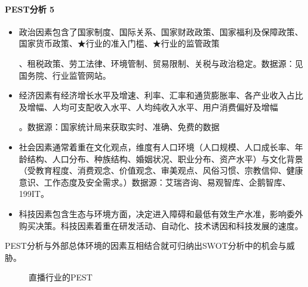 \documentclass[letterpaper,10pt,english]{sphinxmanual}
\begin{document}
\paragraph{PEST分析 5\sphinxfootnotemark[490]}
\label{\detokenize{chapter_knowledge/BRD:pest-5}}%
\begin{footnotetext}[490]\sphinxAtStartFootnote
{}
%
\end{footnotetext}\ignorespaces \begin{itemize}
\item {} 
政治因素包含了国家制度、国际关系、国家财政政策、国家福利及保障政策、国家货币政策、★行业的准入门槛、★行业的监管政策%
\begin{footnote}[491]\sphinxAtStartFootnote
{}
%
\end{footnote}、租税政策、劳工法律、环境管制、贸易限制、关税与政治稳定。数据源：见国务院、行业监管网站。

\item {} 
经济因素有经济增长水平及增速、利率、汇率和通货膨胀率、各产业收入占比及增幅、人均可支配收入水平、人均纯收入水平、用户消费偏好及增幅%
\begin{footnote}[492]\sphinxAtStartFootnote
{}
%
\end{footnote}。数据源：国家统计局来获取实时、准确、免费的数据

\item {} 
社会因素通常着重在文化观点，维度有人口环境（人口规模、人口成长率、年龄结构、人口分布、种族结构、婚姻状况、职业分布、资产水平）与文化背景（受教育程度、消费观念、价值观念、审美观点、风俗习惯、宗教信仰、健康意识、工作态度及安全需求。）数据源：艾瑞咨询、易观智库、企鹅智库、199IT。

\item {} 
科技因素包含生态与环境方面，决定进入障碍和最低有效生产水准，影响委外购买决策。科技因素着重在研发活动、自动化、技术诱因和科技发展的速度。

\end{itemize}

PEST分析与外部总体环境的因素互相结合就可归纳出SWOT分析中的机会与威胁。

\begin{figure}[H]
\centering
\capstart

\noindent{}
\caption{直播行业的PEST\sphinxfootnotemark[493]}\label{\detokenize{chapter_knowledge/BRD:id22}}\end{figure}
%
\begin{footnotetext}[493]\sphinxAtStartFootnote
{}
%
\end{footnotetext}\ignorespaces 
\end{document}
